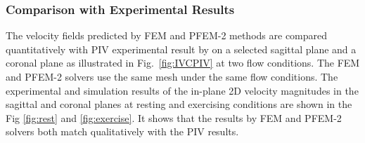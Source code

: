 \subsubsection*{Comparison with Experimental Results}

The velocity fields predicted by FEM and PFEM-2 methods are compared quantitatively with PIV experimental result by \cite{gallagher_exp} on a selected sagittal plane and a coronal plane as illustrated in Fig.~\ref{fig:IVCPIV} at two flow conditions. The FEM and PFEM-2 solvers use the same mesh under the same flow conditions. The experimental and simulation results of the in-plane 2D velocity magnitudes in the sagittal and coronal planes at resting and exercising conditions are shown in the Fig \ref{fig:rest} and \ref{fig:exercise}. It shows that the results by FEM and PFEM-2 solvers both match qualitatively with the PIV results. 

